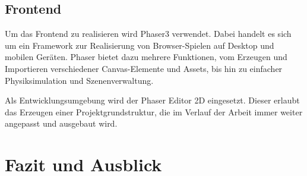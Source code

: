 \documentclass[a4paper, 10pt, conference]{IEEEtran}
\begin{document}
\subsection{Frontend}\label{subsec:frontend-dev-tools}

Um das Frontend zu realisieren wird Phaser3 verwendet. Dabei handelt es sich um ein Framework zur Realisierung von Browser-Spielen auf Desktop und mobilen Geräten. Phaser bietet dazu mehrere Funktionen, vom Erzeugen und Importieren verschiedener Canvas-Elemente und Assets, bis hin zu einfacher Physiksimulation und Szenenverwaltung.

Als Entwicklungsumgebung wird der Phaser Editor 2D eingesetzt. Dieser erlaubt das Erzeugen einer Projektgrundstruktur, die im Verlauf der Arbeit immer weiter angepasst und ausgebaut wird.  




\section{Fazit und Ausblick}\label{sec:fazit}




\printbibliography
\end{document}

